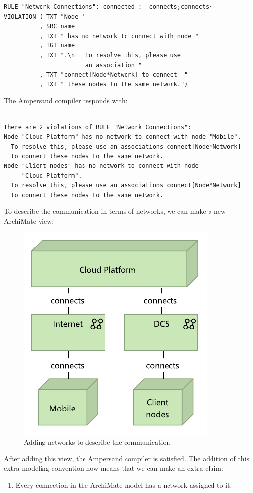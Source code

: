 \documentclass[sn-vancouver]{sn-jnl}%
\theoremstyle{thmstyleone}%
\theoremstyle{thmstyletwo}%
\theoremstyle{thmstylethree}%
\begin{document}
{\small
\begin{lstlisting}[frame=single, label={mc5}, caption={}]
RULE "Network Connections": connected :- connects;connects~
VIOLATION ( TXT "Node "
          , SRC name
          , TXT " has no network to connect with node "
          , TGT name
          , TXT ".\n   To resolve this, please use 
                       an association "
          , TXT "connect[Node*Network] to connect  "
          , TXT " these nodes to the same network.")
\end{lstlisting}
}

The Ampersand compiler responds with:

{\small
\begin{verbatim}

There are 2 violations of RULE "Network Connections":
Node "Cloud Platform" has no network to connect with node "Mobile".
  To resolve this, please use an associations connect[Node*Network]
  to connect these nodes to the same network.
Node "Client nodes" has no network to connect with node 
     "Cloud Platform".
  To resolve this, please use an associations connect[Node*Network]
  to connect these nodes to the same network.

\end{verbatim}
}

To describe the communication in terms of networks, we can make a new ArchiMate view:
\begin{figure}[hbtp]
   \centering
   \includegraphics[clip=true, scale=0.9]{Network connections.pdf}
   \caption{Adding networks to describe the communication}
   \label{fig: Network connections}
\end{figure}
After adding this view, the Ampersand compiler is satisfied.
The addition of this extra modeling convention now means that we can make an extra claim:
\begin{enumerate}
    \item Every connection in the ArchiMate model has a network assigned to it.
\end{enumerate}
\end{document}
